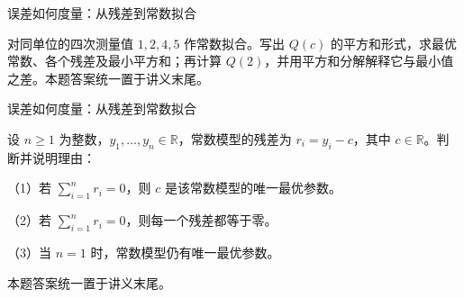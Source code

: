 \documentclass[aspectratio=169,10pt,fontset=fandol]{ctexbeamer}
\begin{document}
\begin{frame}[t,fragile]{误差如何度量：从残差到常数拟合}
\normalsize
{\normalsize
\begin{exercise}
\label{mathagent:exercise:79e91357ee05b8b9aa4c657d553157f1ef411624d282c3f2337dd0e01453ce2d}
对同单位的四次测量值 $1,2,4,5$ 作常数拟合。写出 $Q(c)$ 的平方和形式，求最优常数、各个残差及最小平方和；再计算 $Q(2)$，并用平方和分解解释它与最小值之差。本题答案统一置于讲义末尾。
\end{exercise}
}
\end{frame}
\begin{frame}[t,fragile]{误差如何度量：从残差到常数拟合}
\normalsize
{\normalsize
\begin{exercise}
\label{mathagent:exercise:9e7dbf7ef17df1506f236bbf1ad6ff8c14ff13065df89e12b796d18475228be7}
设 $n\geq1$ 为整数，$y_1,\ldots,y_n\in\mathbb{R}$，常数模型的残差为 $r_i=y_i-c$，其中 $c\in\mathbb{R}$。判断并说明理由：

（1）若 $\sum_{i=1}^{n}r_i=0$，则 $c$ 是该常数模型的唯一最优参数。

（2）若 $\sum_{i=1}^{n}r_i=0$，则每一个残差都等于零。

（3）当 $n=1$ 时，常数模型仍有唯一最优参数。

本题答案统一置于讲义末尾。
\end{exercise}
}
\end{frame}
\end{document}
